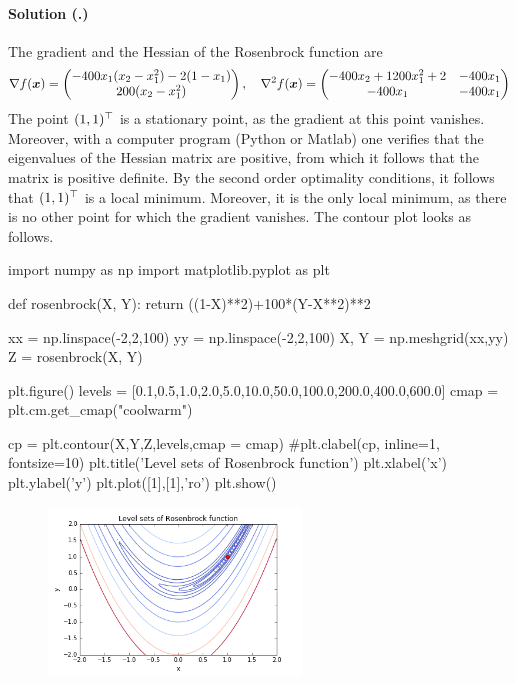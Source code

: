 \documentclass{article}
\newcounter{problemSheetNumber}
\newcounter{problems}
\renewcommand{\solution}[1]{\paragraph{Solution (\theproblemSheetNumber.\theproblems)}\addtocounter{problems}{1}\label{#1}}
\begin{document}
\solution{pr:4} The gradient and the Hessian of the Rosenbrock function are
\begin{equation*}
  \nabla f(\bm{x}) = \begin{pmatrix}
  -400x_1(x_2-x_1^2)-2(1-x_1)\\
  200 (x_2-x_1^2)
  \end{pmatrix}, \quad \nabla^2f(\bm{x}) = \begin{pmatrix}
  -400x_2+1200 x_1^2+2 & -400 x_1\\
  -400 x_1 & -400 x_1
  \end{pmatrix}
\end{equation*}
The point $(1,1)^{\top}$ is a stationary point, as the gradient at this point vanishes. Moreover, with a computer program (Python or Matlab) one verifies that the eigenvalues of the Hessian matrix are positive, from which it follows that the matrix is positive definite. By the second order optimality conditions, it follows that $(1,1)^{\top}$ is a local minimum. Moreover, it is the only local minimum, as there is no other point for which the gradient vanishes. The contour plot looks as follows.

\begin{ipythonnb}
import numpy as np
import matplotlib.pyplot as plt

def rosenbrock(X, Y):
    return ((1-X)**2)+100*(Y-X**2)**2

xx = np.linspace(-2,2,100)
yy = np.linspace(-2,2,100)
X, Y = np.meshgrid(xx,yy)
Z = rosenbrock(X, Y)

plt.figure()
levels = [0.1,0.5,1.0,2.0,5.0,10.0,50.0,100.0,200.0,400.0,600.0]
cmap = plt.cm.get_cmap("coolwarm")

cp = plt.contour(X,Y,Z,levels,cmap = cmap)
#plt.clabel(cp, inline=1, fontsize=10)
plt.title('Level sets of Rosenbrock function')
plt.xlabel('x')
plt.ylabel('y')
plt.plot([1],[1],'ro')
plt.show()
\end{ipythonnb}

\begin{figure}[h!]
\centering
\includegraphics[width=0.6\textwidth]{images/rosenbrock.png}
\end{figure}
\end{document}
